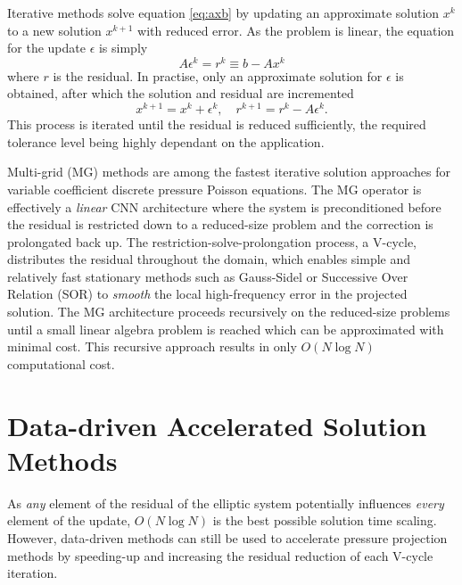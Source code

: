 \documentclass[review]{elsarticle}
\begin{document}
Iterative methods solve equation \ref{eq:axb} by updating an approximate solution $x^k$ to a new solution $x^{k+1}$ with reduced error. As the problem is linear, the equation for the update $\epsilon$ is simply
\begin{equation}
    A \epsilon^k = r^k \equiv b - Ax^k
\end{equation}
where $r$ is the residual. In practise, only an approximate solution for $\epsilon$ is obtained, after which the solution and residual are incremented
\begin{equation}
    x^{k+1} = x^k+\epsilon^k, \quad r^{k+1} = r^k-A\epsilon^k.
\end{equation}
This process is iterated until the residual is reduced sufficiently, the required tolerance level being highly dependant on the application.

Multi-grid (MG) methods are among the fastest iterative solution approaches for variable coefficient discrete pressure Poisson equations. The MG operator is effectively a \textit{linear} CNN architecture where the system is preconditioned before the residual is restricted down to a reduced-size problem and the correction is prolongated back up. 
The restriction-solve-prolongation process, a V-cycle, distributes the residual throughout the domain, which enables simple and relatively fast stationary methods such as Gauss-Sidel or Successive Over Relation (SOR) to \textit{smooth} the local high-frequency error in the projected solution. The MG architecture proceeds recursively on the reduced-size problems until a small linear algebra problem is reached which can be approximated with minimal cost. This recursive approach results in only $O(N\log N)$ computational cost.

\section{Data-driven Accelerated Solution Methods}

As \textit{any} element of the residual of the elliptic system potentially influences \textit{every} element of the update, $O(N\log N)$ is the best possible solution time scaling. However, data-driven methods can still be used to accelerate pressure projection methods by speeding-up and increasing the residual reduction of each V-cycle iteration.
\end{document}
